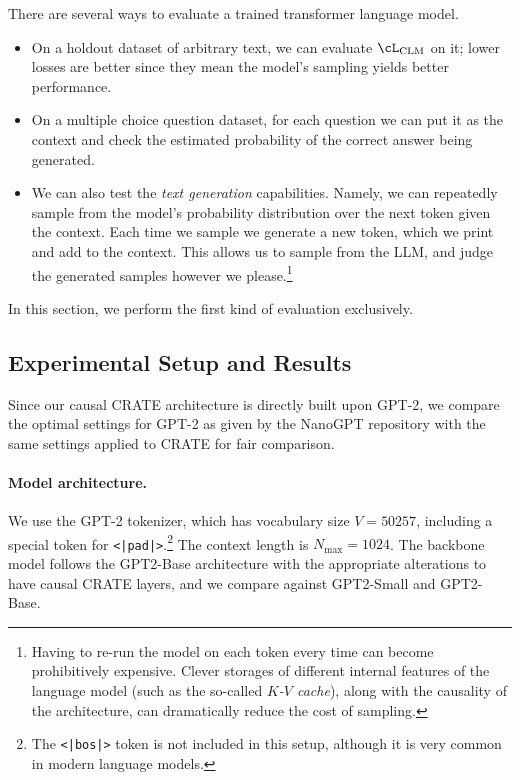\documentclass[\toplevelprefix/book-main.tex]{subfiles}
\begin{document}
There are several ways to evaluate a trained transformer language model.
\begin{itemize}
    \item On a holdout dataset of arbitrary text, we can evaluate \(\cL_{\mathrm{CLM}}\) on it; lower losses are better since they mean the model's sampling yields better performance.
    \item On a multiple choice question dataset, for each question we can put it as the context and check the estimated probability of the correct answer being generated.
    \item We can also test the \textit{text generation} capabilities. Namely, we can repeatedly sample from the model's probability distribution over the next token given the context. Each time we sample we generate a new token, which we print and add to the context. This allows us to sample from the LLM, and judge the generated samples however we please.\footnote{Having to re-run the model on each token every time can become prohibitively expensive. Clever storages of different internal features of the language model (such as the so-called \textit{\(K\)-\(V\) cache}), along with the causality of the architecture, can dramatically reduce the cost of sampling.}
\end{itemize}
In this section, we perform the first kind of evaluation exclusively.

\subsection{Experimental Setup and Results}

Since our causal CRATE architecture is directly built upon GPT-2, we compare the optimal settings for GPT-2 as given by the NanoGPT repository \citep{nanogpt} with the same settings applied to CRATE for fair comparison.

\paragraph{Model architecture.} We use the GPT-2 tokenizer, which has vocabulary size \(V = 50257\), including a special token for \texttt{<|pad|>}.\footnote{The \texttt{<|bos|>} token is not included in this setup, although it is very common in modern language models.} The context length is \(N_{\max} = 1024\). The backbone model follows the GPT2-Base architecture \citep{radford2019language} with the appropriate alterations to have causal CRATE layers, and we compare against GPT2-Small and GPT2-Base.
\end{document}
